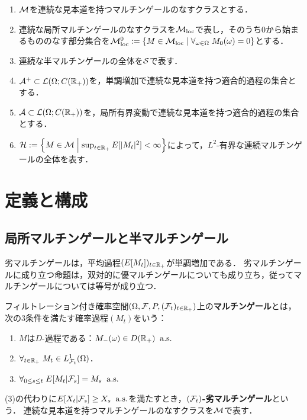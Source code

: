 \documentclass[uplatex,dvipdfmx]{jsreport}
\begin{document}
\begin{notation}\mbox{}
    \begin{enumerate}
        \item $\M$を連続な見本道を持つマルチンゲールのなすクラスとする．
        \item 連続な局所マルチンゲールのなすクラスを$\M_\loc$で表し，そのうち$0$から始まるもののなす部分集合を$\M_\loc^0:=\Brace{M\in\M_\loc\mid\forall_{\om\in\Om}\;M_0(\om)=0}$とする．
        \item 連続な半マルチンゲールの全体を$\S$で表す．
        \item $\A^+\subset\L(\Om;C(\R_+))$を，単調増加で連続な見本道を持つ適合的過程の集合とする．
        \item $\A\subset\L(\Om;C(\R_+))$を，局所有界変動で連続な見本道を持つ適合的過程の集合とする．
        \item $\H:=\Brace{M\in\M\;\middle|\;\sup_{t\in\R_+}E[\abs{M_t}^2]<\infty}$によって，$L^2$-有界な連続マルチンゲールの全体を表す．
    \end{enumerate}
\end{notation}

\section{定義と構成}

\subsection{局所マルチンゲールと半マルチンゲール}

\begin{tcolorbox}[colframe=ForestGreen, colback=ForestGreen!10!white,breakable,colbacktitle=ForestGreen!40!white,coltitle=black,fonttitle=\bfseries\sffamily,
title=]
    劣マルチンゲールは，平均過程$(E[M_t])_{t\in\R_+}$が単調増加である．
    劣マルチンゲールに成り立つ命題は，双対的に優マルチンゲールについても成り立ち，従ってマルチンゲールについては等号が成り立つ．
\end{tcolorbox}

\begin{definition}
    フィルトレーション付き確率空間$(\Om,\F,P,(\F_t)_{t\in\R_+})$上の\textbf{マルチンゲール}とは，次の3条件を満たす確率過程$(M_t)$をいう：
    \begin{enumerate}
        \item $M$は$D$-過程である：$M_-(\om)\in D(\R_+)\;\as$
        \item $\forall_{t\in\R_+}\;M_t\in L^1_{\F_t}(\Om)$．
        \item $\forall_{0\le s\le t}\;E[M_t|\F_s]=M_s\;\as$
    \end{enumerate}
    (3)の代わりに$E[X_t|\F_s]\ge X_s\;\as$を満たすとき，\textbf{$(\F_t)$-劣マルチンゲール}という．
    連続な見本道を持つマルチンゲールのなすクラスを$\M$で表す．
\end{definition}
\end{document}
